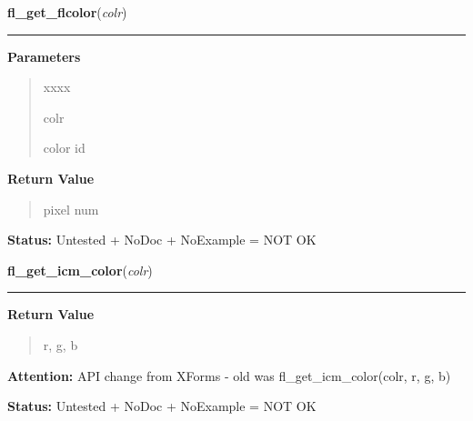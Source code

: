\hspace{.8\funcindent}\begin{boxedminipage}{\funcwidth}

    \raggedright \textbf{fl\_get\_flcolor}(\textit{colr})

    \vspace{-1.5ex}

    \rule{\textwidth}{0.5\fboxrule}
\setlength{\parskip}{2ex}
\setlength{\parskip}{1ex}
      \textbf{Parameters}
      \vspace{-1ex}

      \begin{quote}
        \begin{Ventry}{xxxx}

          \item[colr]

          color id

        \end{Ventry}

      \end{quote}

      \textbf{Return Value}
    \vspace{-1ex}

      \begin{quote}
      pixel num

      \end{quote}

\textbf{Status:} Untested + NoDoc + NoExample = NOT OK



    \end{boxedminipage}

    \label{xformslib:library:fl_get_icm_color}

    \vspace{0.5ex}

\hspace{.8\funcindent}\begin{boxedminipage}{\funcwidth}

    \raggedright \textbf{fl\_get\_icm\_color}(\textit{colr})

    \vspace{-1.5ex}

    \rule{\textwidth}{0.5\fboxrule}
\setlength{\parskip}{2ex}
\setlength{\parskip}{1ex}
      \textbf{Return Value}
    \vspace{-1ex}

      \begin{quote}
      r, g, b

      \end{quote}

\textbf{Attention:} API change from XForms - old was fl\_get\_icm\_color(colr, r, g, b)



\textbf{Status:} Untested + NoDoc + NoExample = NOT OK



    \end{boxedminipage}

